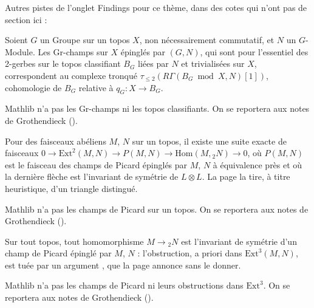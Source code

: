 \bigskip
\noindent Autres pistes de l'onglet Findings pour ce thème, dans des cotes qui n'ont pas de section ici :\par

\begin{encadre}
\begin{theoreme*}\nonverifie
Soient $G$ un Groupe sur un topos $X$, non nécessairement commutatif, et $N$ un $G$-Module. Les Gr-champs sur $X$ épinglés par $(G, N)$, qui sont pour l'essentiel des 2-gerbes sur le topos classifiant $B_G$ liées par $N$ et trivialisées sur $X$, correspondent au complexe tronqué $\tau_{\leq 2}(R\Gamma(B_G \bmod X, N)[1])$, cohomologie de $B_G$ relative à $q_G : X \to B_G$.
\end{theoreme*}
\end{encadre}
{\small Mathlib n'a pas les Gr-champs ni les topos classifiants. On se reportera aux notes de Grothendieck ().\par}

\begin{encadre}
\begin{theoreme*}\nonverifie
Pour des faisceaux abéliens $M$, $N$ sur un topos, il existe une suite exacte de faisceaux $0 \to \mathrm{Ext}^2(M, N) \to P(M, N) \to \mathrm{Hom}(M, {}_2N) \to 0$, où $P(M, N)$ est le faisceau des champs de Picard épinglés par $M$, $N$ à équivalence près et où la dernière flèche est l'invariant de symétrie de $L \otimes L$. La page la tire, à titre heuristique, d'un triangle distingué.
\end{theoreme*}
\end{encadre}
{\small Mathlib n'a pas les champs de Picard sur un topos. On se reportera aux notes de Grothendieck ().\par}

\begin{encadre}
\begin{theoreme*}\nonverifie
Sur tout topos, tout homomorphisme $M \to {}_2N$ est l'invariant de symétrie d'un champ de Picard épinglé par $M$, $N$ : l'obstruction, a priori dans $\mathrm{Ext}^3(M, N)$, est tuée par un argument , que la page annonce  sans le donner.
\end{theoreme*}
\end{encadre}
{\small Mathlib n'a pas les champs de Picard ni leurs obstructions dans $\mathrm{Ext}^3$. On se reportera aux notes de Grothendieck ().\par}
